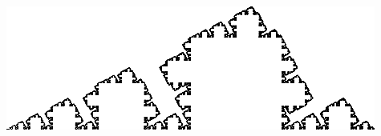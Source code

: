 \begin{exercises}{}{}
\begin{enumerate}
\begin{enumerate}
\begin{minipage}[t]{0.35\linewidth}
	    	\\
	    	\includegraphics[scale=0.64]{fractal}
	    \end{minipage}
		\end{enumerate}
		
	\end{enumerate}

\end{exercises}
	
\vspace{-20pt}
	

